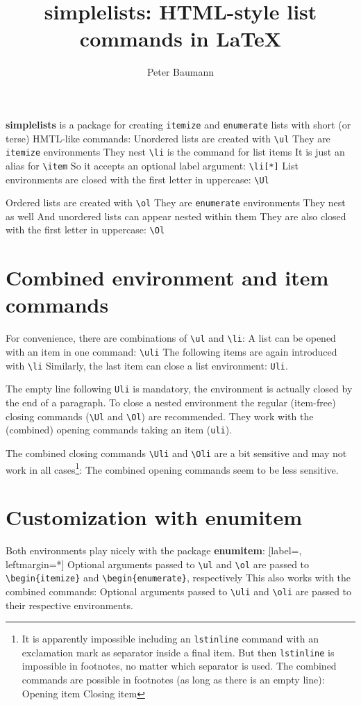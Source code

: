 \documentclass{article}
\title{\textbf{simplelists}: HTML-style list commands in \LaTeX{}}
\author{Peter Baumann}
\date{}
\begin{document}
\maketitle\noindent
\textbf{simplelists} is a package for creating \lstinline!itemize! and \lstinline!enumerate! lists with short (or terse) HMTL-like commands:
\ul
\li Unordered lists are created with \lstinline!\ul!
\li They are \lstinline!itemize! environments
\ul
\li They nest
\li \lstinline!\li! is the command for list items
\li It is just an alias for \lstinline!\item!
\li[*] So it accepts an optional label argument: \lstinline!\li[*]!
\Ul
\li List environments are closed with the first letter in uppercase: \lstinline!\Ul!
\Ul

\ol
\li Ordered lists are created with \lstinline!\ol!
\li They are \lstinline!enumerate! environments
\ol
\li They nest as well
\ul 
\li And unordered lists can appear nested within them 
\Ul
\Ol
\li They are also closed with the first letter in uppercase: \lstinline!\Ol!
\Ol

\section*{Combined environment and item commands}
For convenience, there are combinations of \lstinline!\ul! and \lstinline!\li!:
\uli A list can be opened with an item in one command: \lstinline!\uli!
\li The following items are again introduced with \lstinline!\li!
\Uli Similarly, the last item can close a list environment: \lstinline$Uli$. 

The empty line following \lstinline$Uli$ is mandatory, the environment is actually closed by the end of a paragraph. To close a nested environment the regular (item-free) closing commands (\lstinline!\Ul! and \lstinline!\Ol!) are recommended. They work with the (combined) opening commands taking an item (\lstinline$uli$). 

The combined closing commands \lstinline!\Uli! and \lstinline!\Oli! are a bit sensitive and may not work in all cases\footnote{It is apparently impossible including an \texttt{lstinline} command with an exclamation mark as separator inside a final item. But then \texttt{lstinline} is impossible in footnotes, no matter which separator is used. The combined commands are possible in footnotes (as long as there is an empty line):
\uli Opening item
\Uli Closing item

}:  The combined opening commands seem to be less sensitive.

\section*{Customization with enumitem}
Both environments play nicely with the package \textbf{enumitem}:
\ul[label=\textregistered, leftmargin=*]
\li Optional arguments passed to \lstinline!\ul! and \lstinline!\ol! 
\li are passed to \lstinline!\begin{itemize}! and \lstinline!\begin{enumerate}!, respectively
\Ul
This also works with the combined commands:
\uli[label=\textregistered, leftmargin=*] Optional arguments passed to \lstinline$\uli$ and \lstinline$\oli$
\Uli are passed to their respective environments.
\end{document}
